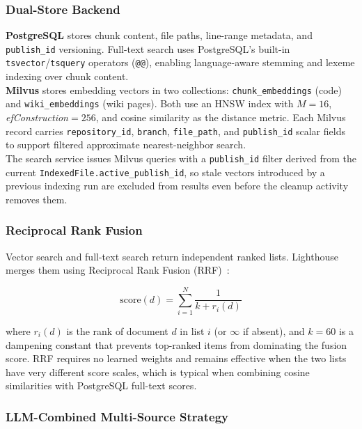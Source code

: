 \documentclass[a4paper,12pt]{article}
\begin{document}
\subsubsection{Dual-Store Backend}

\textbf{PostgreSQL} stores chunk content, file paths, line-range metadata,
and \texttt{publish\_id} versioning.
Full-text search uses PostgreSQL's built-in \texttt{tsvector}/\texttt{tsquery}
operators (\texttt{@@}), enabling language-aware stemming and lexeme indexing
over chunk content.\\

\textbf{Milvus} stores embedding vectors in two collections:
\texttt{chunk\_embeddings} (code) and \texttt{wiki\_embeddings} (wiki pages).
Both use an HNSW index with $M=16$, \textit{efConstruction}$=256$, and
cosine similarity as the distance metric.
Each Milvus record carries \texttt{repository\_id}, \texttt{branch},
\texttt{file\_path}, and \texttt{publish\_id} scalar fields to support
filtered approximate nearest-neighbor search.\\

The search service issues Milvus queries with a \texttt{publish\_id} filter
derived from the current \texttt{IndexedFile.active\_publish\_id}, so stale
vectors introduced by a previous indexing run are excluded from results even
before the cleanup activity removes them.

\subsubsection{Reciprocal Rank Fusion}

Vector search and full-text search return independent ranked lists.
Lighthouse merges them using Reciprocal Rank Fusion
(RRF)~\cite{cormack2009rrf}:

\begin{equation}
  \text{score}(d) = \sum_{i=1}^{N} \frac{1}{k + r_i(d)}
  \label{eq:rrf}
\end{equation}

where $r_i(d)$ is the rank of document $d$ in list $i$ (or $\infty$ if
absent), and $k = 60$ is a dampening constant that prevents top-ranked items
from dominating the fusion score.
RRF requires no learned weights and remains effective when the two lists
have very different score scales, which is typical when combining cosine
similarities with PostgreSQL full-text scores.

\subsubsection{LLM-Combined Multi-Source Strategy}
\end{document}
